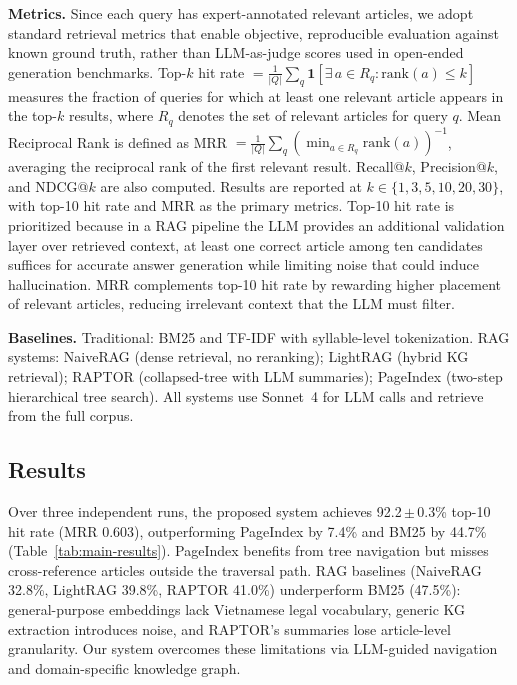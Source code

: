 \documentclass{IOS-Book-Article}
\begin{document}
\textbf{Metrics.} Since each query has expert-annotated relevant articles, we adopt standard retrieval metrics \cite{r19} that enable objective, reproducible evaluation against known ground truth, rather than LLM-as-judge scores used in open-ended generation benchmarks. Top-$k$ hit rate $= \frac{1}{|Q|}\sum_{q} \mathbf{1}[\exists\, a \in R_q : \text{rank}(a) \leq k]$ measures the fraction of queries for which at least one relevant article appears in the top-$k$ results, where $R_q$ denotes the set of relevant articles for query $q$. Mean Reciprocal Rank is defined as MRR $= \frac{1}{|Q|}\sum_q (\min_{a \in R_q} \text{rank}(a))^{-1}$, averaging the reciprocal rank of the first relevant result. Recall@$k$, Precision@$k$, and NDCG@$k$ \cite{r19} are also computed. Results are reported at $k \in \{1, 3, 5, 10, 20, 30\}$, with top-10 hit rate and MRR as the primary metrics. Top-10 hit rate is prioritized because in a RAG pipeline the LLM provides an additional validation layer over retrieved context, at least one correct article among ten candidates suffices for accurate answer generation while limiting noise that could induce hallucination. MRR complements top-10 hit rate by rewarding higher placement of relevant articles, reducing irrelevant context that the LLM must filter.

\textbf{Baselines.} Traditional: BM25 \cite{r18} and TF-IDF \cite{r19} with syllable-level tokenization. RAG systems: NaiveRAG \cite{r2} (dense retrieval, no reranking); LightRAG \cite{r5} (hybrid KG retrieval); RAPTOR \cite{r29} (collapsed-tree with LLM summaries); PageIndex \cite{r7} (two-step hierarchical tree search). All systems use Sonnet~4 for LLM calls and retrieve from the full corpus.

\subsection{Results}

Over three independent runs, the proposed system achieves 92.2\,$\pm$\,0.3\% top-10 hit rate (MRR 0.603), outperforming PageIndex by 7.4\% and BM25 by 44.7\% (Table~\ref{tab:main-results}). PageIndex benefits from tree navigation but misses cross-reference articles outside the traversal path. RAG baselines (NaiveRAG 32.8\%, LightRAG 39.8\%, RAPTOR 41.0\%) underperform BM25 (47.5\%): general-purpose embeddings lack Vietnamese legal vocabulary, generic KG extraction introduces noise, and RAPTOR's summaries lose article-level granularity. Our system overcomes these limitations via LLM-guided navigation and domain-specific knowledge graph.
\end{document}

